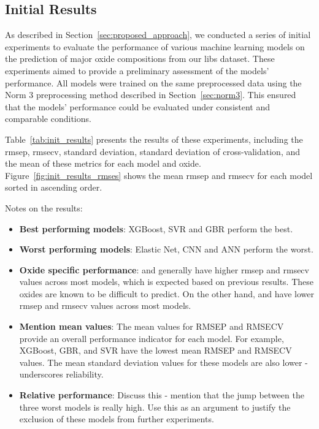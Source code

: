 \subsection{Initial Results}
As described in Section~\ref{sec:proposed_approach}, we conducted a series of initial experiments to evaluate the performance of various machine learning models on the prediction of major oxide compositions from our \gls{libs} dataset.
These experiments aimed to provide a preliminary assessment of the models' performance.
All models were trained on the same preprocessed data using the Norm 3 preprocessing method described in Section~\ref{sec:norm3}.
This ensured that the models' performance could be evaluated under consistent and comparable conditions.

Table~\ref{tab:init_results} presents the results of these experiments, including the \gls{rmsep}, \gls{rmsecv}, standard deviation, standard deviation of cross-validation, and the mean of these metrics for each model and oxide.
Figure~\ref{fig:init_results_rmses} shows the mean \gls{rmsep} and \gls{rmsecv} for each model sorted in ascending order.

Notes on the results:
\begin{itemize}
    \item \textbf{Best performing models}: XGBoost, SVR and GBR perform the best.
    \item \textbf{Worst performing models}: Elastic Net, CNN and ANN perform the worst.
    \item \textbf{Oxide specific performance}:  and  generally have higher \gls{rmsep} and \gls{rmsecv} values across most models, which is expected based on previous results. These oxides are known to be difficult to predict. On the other hand,  and  have lower \gls{rmsep} and \gls{rmsecv} values across most models.
    \item \textbf{Mention mean values}: The mean values for RMSEP and RMSECV provide an overall performance indicator for each model. For example, XGBoost, GBR, and SVR have the lowest mean RMSEP and RMSECV values. The mean standard deviation values for these models are also lower - underscores reliability.
    \item \textbf{Relative performance}: Discuss this - mention that the jump between the three worst models is really high. Use this as an argument to justify the exclusion of these models from further experiments.
\end{itemize}

